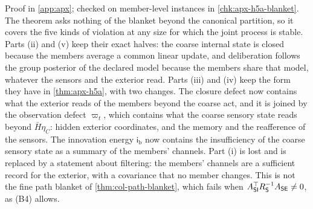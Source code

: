 Proof in \cref{app:apx}; checked on member-level instances in \cref{chk:apx-h5a-blanket}. The theorem asks nothing of the blanket beyond the canonical partition, so it covers the five kinds of violation at any size for which the joint process is stable. Parts (ii) and (v) keep their exact halves: the coarse internal state is closed because the members average a common linear update, and deliberation follows the group posterior of the declared model because the members share that model, whatever the sensors and the exterior read. Parts (iii) and (iv) keep the form they have in \cref{thm:apx-h5a}, with two changes. The closure defect now contains what the exterior reads of the members beyond the coarse act, and it is joined by the observation defect $\varpi_t$, which contains what the coarse sensory state reads beyond $\bar H\eta_C$: hidden exterior coordinates, and the memory and the reafference of the sensors. The innovation energy $\mathsf i_{\mathrm b}$ now contains the insufficiency of the coarse sensory state as a summary of the members' channels. Part (i) is lost and is replaced by a statement about filtering: the members' channels are a sufficient record for the exterior, with a covariance that no member changes. This is not the fine path blanket of \cref{thm:col-path-blanket}, which fails when $A_{\mathsf{S}\mathsf{I}}^\top R_{\mathsf{S}}^{-1}A_{\mathsf{S}\mathsf{E}}\ne0$, as (B4) allows.

